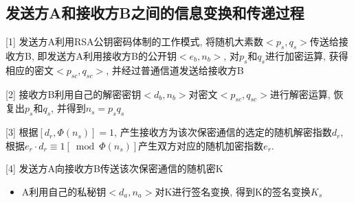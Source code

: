 \documentclass[UTF8]{ctexart}
\begin{document}
    \subsection{发送方A和接收方B之间的信息变换和传递过程}
    [1] 发送方A利用RSA公钥密码体制的工作模式, 将随机大素数$<p_s, q_s>$传送给接收方B, 即发送方A利用接收方B的公开钥$<e_b, n_b>$, 对$p_s$和$q_s$进行加密运算, 获得相应的密文$<p_{sc}, q_{sc}>$, 并经过普通信道发送给接收方B

    [2] 接收方B利用自己的解密密钥$<d_b, n_b>$对密文$<p_{sc}, q_{sc}>$进行解密运算, 恢复出$p_s$和$q_s$, 并得到$n_s=p_sq_s$

    [3] 根据$[d_r, \Phi(n_s)]=1$, 产生接收方为该次保密通信的选定的随机解密指数$d_r$, 根据$e_r\cdot d_r\equiv 1[\bmod \Phi(n_s)]$产生双方对应的随机加密指数$e_r$.

    [4] 发送方A向接收方B传送该次保密通信的随机密K
    \begin{itemize}
        \item A利用自己的私秘钥$<d_a, n_a>$对K进行签名变换, 得到K的签名变换$K_s$
    \end{itemize}
\end{document}
